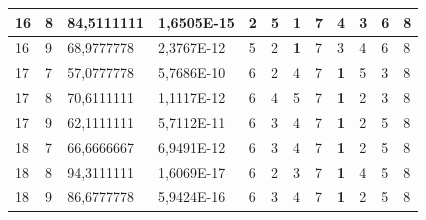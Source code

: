 \documentclass[conference]{IEEEtran}
\begin{document}
\begin{table}[]
\begin{tabular}{|llll|llllllll|}
		\multicolumn{1}{|l|}{16} & \multicolumn{1}{l|}{8} & \multicolumn{1}{l|}{84,5111111} & 1,6505E-15 & \multicolumn{1}{l|}{2} & \multicolumn{1}{l|}{5} & \multicolumn{1}{l|}{\textbf{1}} & \multicolumn{1}{l|}{7} & \multicolumn{1}{l|}{4} & \multicolumn{1}{l|}{3} & \multicolumn{1}{l|}{6} & 8 \\ \hline
		\multicolumn{1}{|l|}{16} & \multicolumn{1}{l|}{9} & \multicolumn{1}{l|}{68,9777778} & 2,3767E-12 & \multicolumn{1}{l|}{5} & \multicolumn{1}{l|}{2} & \multicolumn{1}{l|}{\textbf{1}} & \multicolumn{1}{l|}{7} & \multicolumn{1}{l|}{3} & \multicolumn{1}{l|}{4} & \multicolumn{1}{l|}{6} & 8 \\ \hline
		\multicolumn{1}{|l|}{17} & \multicolumn{1}{l|}{7} & \multicolumn{1}{l|}{57,0777778} & 5,7686E-10 & \multicolumn{1}{l|}{6} & \multicolumn{1}{l|}{2} & \multicolumn{1}{l|}{4} & \multicolumn{1}{l|}{7} & \multicolumn{1}{l|}{\textbf{1}} & \multicolumn{1}{l|}{5} & \multicolumn{1}{l|}{3} & 8 \\ \hline
		\multicolumn{1}{|l|}{17} & \multicolumn{1}{l|}{8} & \multicolumn{1}{l|}{70,6111111} & 1,1117E-12 & \multicolumn{1}{l|}{6} & \multicolumn{1}{l|}{4} & \multicolumn{1}{l|}{5} & \multicolumn{1}{l|}{7} & \multicolumn{1}{l|}{\textbf{1}} & \multicolumn{1}{l|}{2} & \multicolumn{1}{l|}{3} & 8 \\ \hline
		\multicolumn{1}{|l|}{17} & \multicolumn{1}{l|}{9} & \multicolumn{1}{l|}{62,1111111} & 5,7112E-11 & \multicolumn{1}{l|}{6} & \multicolumn{1}{l|}{3} & \multicolumn{1}{l|}{4} & \multicolumn{1}{l|}{7} & \multicolumn{1}{l|}{\textbf{1}} & \multicolumn{1}{l|}{2} & \multicolumn{1}{l|}{5} & 8 \\ \hline
		\multicolumn{1}{|l|}{18} & \multicolumn{1}{l|}{7} & \multicolumn{1}{l|}{66,6666667} & 6,9491E-12 & \multicolumn{1}{l|}{6} & \multicolumn{1}{l|}{3} & \multicolumn{1}{l|}{4} & \multicolumn{1}{l|}{7} & \multicolumn{1}{l|}{\textbf{1}} & \multicolumn{1}{l|}{2} & \multicolumn{1}{l|}{5} & 8 \\ \hline
		\multicolumn{1}{|l|}{18} & \multicolumn{1}{l|}{8} & \multicolumn{1}{l|}{94,3111111} & 1,6069E-17 & \multicolumn{1}{l|}{6} & \multicolumn{1}{l|}{2} & \multicolumn{1}{l|}{3} & \multicolumn{1}{l|}{7} & \multicolumn{1}{l|}{\textbf{1}} & \multicolumn{1}{l|}{4} & \multicolumn{1}{l|}{5} & 8 \\ \hline
		\multicolumn{1}{|l|}{18} & \multicolumn{1}{l|}{9} & \multicolumn{1}{l|}{86,6777778} & 5,9424E-16 & \multicolumn{1}{l|}{6} & \multicolumn{1}{l|}{3} & \multicolumn{1}{l|}{4} & \multicolumn{1}{l|}{7} & \multicolumn{1}{l|}{\textbf{1}} & \multicolumn{1}{l|}{2} & \multicolumn{1}{l|}{5} & 8 \\ \hline

\end{tabular}
\end{table}
\end{document}

